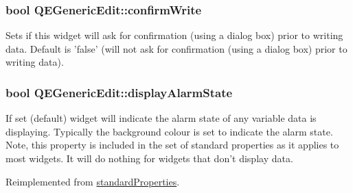 \hypertarget{classQEGenericEdit_ab04f43d93b0c5d813cd5f85c5069d4bd}{
\subsubsection[{confirmWrite}]{\setlength{\rightskip}{0pt plus 5cm}bool QEGenericEdit::confirmWrite}}
\label{classQEGenericEdit_ab04f43d93b0c5d813cd5f85c5069d4bd}
Sets if this widget will ask for confirmation (using a dialog box) prior to writing data. Default is 'false' (will not ask for confirmation (using a dialog box) prior to writing data). \hypertarget{classQEGenericEdit_a663da3081feabe1b0d0194a4e1e744f8}{
\subsubsection[{displayAlarmState}]{\setlength{\rightskip}{0pt plus 5cm}bool QEGenericEdit::displayAlarmState}}
\label{classQEGenericEdit_a663da3081feabe1b0d0194a4e1e744f8}
If set (default) widget will indicate the alarm state of any variable data is displaying. Typically the background colour is set to indicate the alarm state. Note, this property is included in the set of standard properties as it applies to most widgets. It will do nothing for widgets that don't display data. 

Reimplemented from \hyperlink{classstandardProperties}{standardProperties}.


